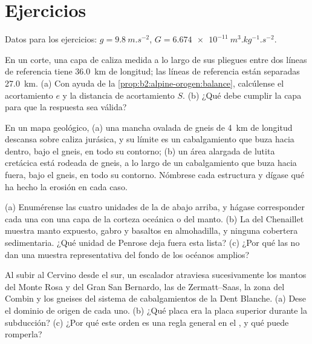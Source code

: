 \section*{Ejercicios}\label{sec:b2:alpine-orogen:exercises}

Datos para los ejercicios: $g = \qty{9.8}{m.s^{-2}}$,
$G = \qty{6.674e-11}{m^3.kg^{-1}.s^{-2}}$.

\begin{exercise}[$\star$]\label{exo:b2:alpine-orogen:1}
En un corte, una capa de caliza medida a lo largo de sus pliegues entre dos líneas de referencia tiene
\qty{36.0}{km} de longitud; las líneas de referencia están separadas \qty{27.0}{km}. (a) Con ayuda de la
\cref{prop:b2:alpine-orogen:balance}, calcúlense el acortamiento $e$ y la distancia de acortamiento
$S$. (b) ¿Qué debe cumplir la capa para que la respuesta sea válida?
\end{exercise}

\begin{exercise}[$\star$]\label{exo:b2:alpine-orogen:2}
En un mapa geológico, (a) una mancha ovalada de gneis de \qty{4}{km} de longitud descansa sobre caliza
jurásica, y su límite es un cabalgamiento que buza hacia dentro, bajo el gneis, en todo su contorno; (b) un
área alargada de lutita cretácica está rodeada de gneis, a lo largo de un cabalgamiento que buza
hacia fuera, bajo el gneis, en todo su contorno. Nómbrese cada estructura y dígase qué ha hecho la erosión
en cada caso.
\end{exercise}

\begin{exercise}[$\star$]\label{exo:b2:alpine-orogen:3}
(a) Enumérense las cuatro unidades de la  de abajo arriba, y hágase corresponder cada una
con una capa de la corteza oceánica o del manto. (b) La  del Chenaillet muestra manto
expuesto, gabro y basaltos en almohadilla, y ninguna cobertera sedimentaria. ¿Qué unidad de Penrose deja
fuera esta lista? (c) ¿Por qué las  no dan una muestra representativa del fondo de los océanos
amplios?
\end{exercise}

\begin{exercise}[$\star$]\label{exo:b2:alpine-orogen:4}
Al subir al Cervino desde el sur, un escalador atraviesa sucesivamente los mantos del Monte Rosa y del
Gran San Bernardo, las  de Zermatt--Saas, la zona del Combin y los gneises del
sistema de cabalgamientos de la Dent Blanche. (a) Dese el dominio de origen de cada uno. (b) ¿Qué placa era
la placa superior durante la subducción? (c) ¿Por qué este orden es una regla general en el ,
y qué puede romperla?
\end{exercise}

